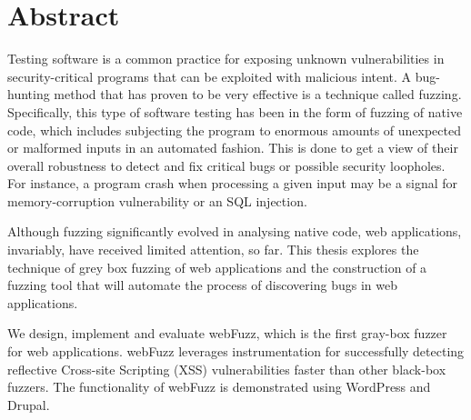 \section*{\LARGE{Abstract}}
Testing software is a common practice for exposing unknown
vulnerabilities in security-critical programs that can be 
exploited with malicious intent. A bug-hunting method that has
proven to be very effective is a technique called fuzzing. Specifically,
this type of software testing has been in the form of fuzzing of native
code, which includes subjecting the program to enormous amounts of
unexpected or malformed inputs in an automated fashion. This is done
to get a view of their overall robustness to detect and fix critical
bugs or possible security loopholes. For instance, a program crash 
when processing a given input may be a signal for memory-corruption 
vulnerability or an SQL injection.

Although fuzzing significantly evolved in analysing native code, web
applications, invariably, have received limited attention, so far. This thesis 
explores the technique of grey box fuzzing of web applications and the 
construction of a fuzzing tool that will automate the process of discovering
bugs in web applications.

We design, implement and evaluate webFuzz, which is the first gray-box
fuzzer for web applications. webFuzz leverages instrumentation for 
successfully detecting reflective Cross-site Scripting (XSS) vulnerabilities
faster than other black-box fuzzers. The functionality of webFuzz is 
demonstrated using WordPress and Drupal.